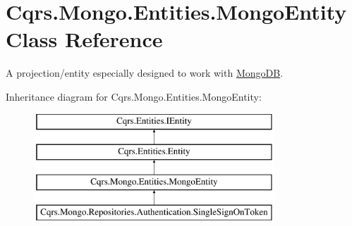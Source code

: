 \hypertarget{classCqrs_1_1Mongo_1_1Entities_1_1MongoEntity}{}\section{Cqrs.\+Mongo.\+Entities.\+Mongo\+Entity Class Reference}
\label{classCqrs_1_1Mongo_1_1Entities_1_1MongoEntity}


A projection/entity especially designed to work with \hyperlink{namespaceCqrs_1_1MongoDB}{Mongo\+DB}.  


Inheritance diagram for Cqrs.\+Mongo.\+Entities.\+Mongo\+Entity\+:\begin{figure}[H]
\begin{center}
\leavevmode
\includegraphics[height=4.000000cm]{classCqrs_1_1Mongo_1_1Entities_1_1MongoEntity}
\end{center}
\end{figure}
